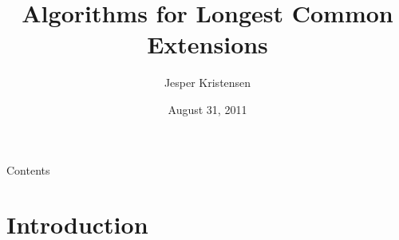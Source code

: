 \documentclass{beamer}
\title{Algorithms for Longest Common Extensions}
\author{Jesper Kristensen}
\institute[DTU Informatics]{DTU Informatics\\Technical University of Denmark}
\date{August 31, 2011}
\begin{document}
\newcommand{\sortt}{\textit{sort}(n,\sigma)}
\newcommand{\LCE}{\textit{LCE}}
\newcommand{\NCA}{\textit{NCA}}
\newcommand{\RMQ}{\textit{RMQ}}
\newcommand{\SA}{\textit{SA}}
\newcommand{\SAinv}{\textit{SA}^{-1}} %
\newcommand{\SAi}{SA$^{-1}$} %
\newcommand{\LCP}{\textit{LCP}}
\newcommand{\LA}{\textit{LA}}
\newcommand{\suff}{\textit{suff}}
\newcommand{\logceil}{\lceil\log n\rceil}
\newcommand{\fprint}[1][k]{\ensuremath{\proc{Fingerprint}_{#1}}}
\newcommand{\fprintk}{\fprint[k]}
\newcommand{\RMQpq}[2]{RMQ\textless$#1$, $#2$\textgreater}
\newcommand{\RMQn}{\RMQpq{1}{n}}
\newcommand{\RMQq}{\RMQpq{n}{1}}
\newcommand{\RMQlog}{\RMQpq{n}{\log n}}

\begin{frame}
\titlepage
\end{frame}

\begin{frame}{Contents}
\tableofcontents
\end{frame}

\section{Introduction}
\end{document}
